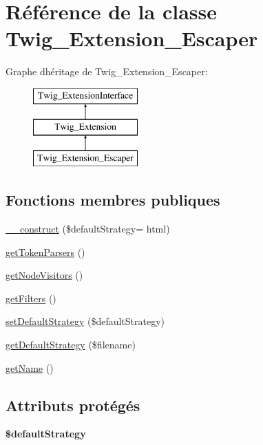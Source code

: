 \hypertarget{class_twig___extension___escaper}{}\section{Référence de la classe Twig\+\_\+\+Extension\+\_\+\+Escaper}
\label{class_twig___extension___escaper}
Graphe d\textquotesingle{}héritage de Twig\+\_\+\+Extension\+\_\+\+Escaper\+:\begin{figure}[H]
\begin{center}
\leavevmode
\includegraphics[height=3.000000cm]{class_twig___extension___escaper}
\end{center}
\end{figure}
\subsection*{Fonctions membres publiques}
\begin{DoxyCompactItemize}
\item 
\hyperlink{class_twig___extension___escaper_ab55f082b420ecc326fca4ede1a471709}{\+\_\+\+\_\+construct} (\$default\+Strategy= \textquotesingle{}html\textquotesingle{})
\item 
\hyperlink{class_twig___extension___escaper_a8fd35903c3d01c0f0078f59d142eb063}{get\+Token\+Parsers} ()
\item 
\hyperlink{class_twig___extension___escaper_aec02093179d390d22ae4083f23a1d74a}{get\+Node\+Visitors} ()
\item 
\hyperlink{class_twig___extension___escaper_a428d91319fc73d3038784cf5436936b6}{get\+Filters} ()
\item 
\hyperlink{class_twig___extension___escaper_a567473dcbaced1e4ffc5b3b0c5e568f3}{set\+Default\+Strategy} (\$default\+Strategy)
\item 
\hyperlink{class_twig___extension___escaper_a8c9abab9ba2519ae254eb896eb61073b}{get\+Default\+Strategy} (\$filename)
\item 
\hyperlink{class_twig___extension___escaper_a3d0963e68bb313b163a73f2803c64600}{get\+Name} ()
\end{DoxyCompactItemize}
\subsection*{Attributs protégés}
\begin{DoxyCompactItemize}
\item 
{\bfseries \$default\+Strategy}\hypertarget{class_twig___extension___escaper_add8b7fa48484c8d41707819868a0b32f}{}\label{class_twig___extension___escaper_add8b7fa48484c8d41707819868a0b32f}

\end{DoxyCompactItemize}


